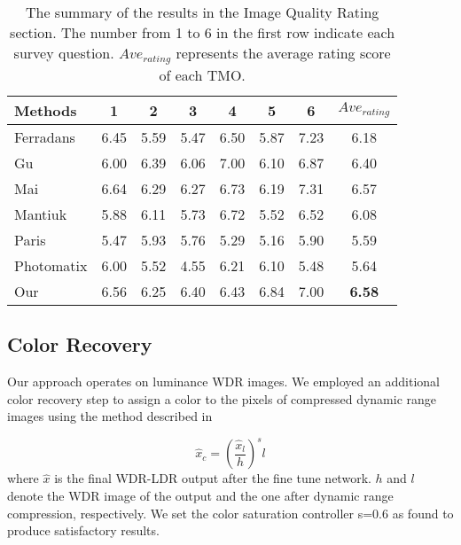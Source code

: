 \documentclass[journal]{IEEEtran}
\begin{document}
\begin{table*}[t]
\footnotesize
\begin{center}
\caption{The summary of the results in the Image Quality Rating section. The number from 1 to 6 in the first row indicate each survey question.  $Ave_{rating}$ represents the average rating score of each TMO.}
\begin{tabular}{l|c|c|c|c|c|c|c}\hline
  Methods & 1 & 2 & 3 & 4 & 5 & 6 & $Ave_{rating}$ \\ \hline
  Ferradans \cite{ferradans2011analysis} & 6.45 & 5.59 & 5.47 & 6.50 & 5.87 & 7.23 & 6.18 \\
Gu \cite{gu2013local} & 6.00 & 6.39 & 6.06 & 7.00 & 6.10 & 6.87 & 6.40 \\
Mai \cite{mai2011optimizing} & 6.64 & 6.29 & 6.27 & 6.73 & 6.19 & 7.31 & 6.57 \\
Mantiuk \cite{mantiuk2008display} & 5.88 & 6.11 & 5.73 & 6.72 & 5.52 & 6.52 & 6.08 \\
Paris \cite{paris2015local} & 5.47 & 5.93 & 5.76 & 5.29 & 5.16 & 5.90 & 5.59 \\
Photomatix \cite{photomatrix} & 6.00 & 5.52 & 4.55 & 6.21 & 6.10 & 5.48 & 5.64 \\
Our & 6.56 & 6.25 & 6.40 & 6.43 & 6.84 & 7.00 & \textbf{6.58} \\

  \hline
\end{tabular}
\label{table:survey_2}
\end{center}
\end{table*}

\subsection{Color Recovery}
Our approach operates on luminance WDR images.  We employed an additional color recovery step to assign a color to the pixels of compressed dynamic range images using the method described in \cite{fattal2002gradient}

\begin{equation}
    \hat{x}_{c} = (\frac{\hat{x}_{l}}{h})^sl
\end{equation}
where $\hat{x}$ is the final WDR-LDR output after the fine tune network. $h$ and $l$ denote the WDR image of the output and the one after dynamic range compression, respectively.  We set the color saturation controller s=0.6 as \cite{fattal2002gradient} found to produce satisfactory results.
\end{document}

